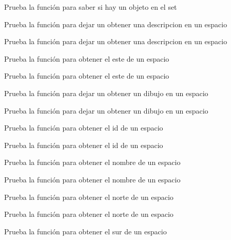 \begin{DoxyRefList}
Prueba la función para saber si hay un objeto en el set  
\item[\label{test__test000277}%
\Hypertarget{test__test000277}%
Member \hyperlink{space__test_8h_aebfa57e927e8f871e73425975c11976b}{test2\+\_\+space\+\_\+get\+\_\+description} ()]Prueba la función para dejar un obtener una descripcion en un espacio 

Prueba la función para dejar un obtener una descripcion en un espacio  
\item[\label{test__test000263}%
\Hypertarget{test__test000263}%
Member \hyperlink{space__test_8h_a249293510e61c6d5465f52c14343d02b}{test2\+\_\+space\+\_\+get\+\_\+east} ()]Prueba la función para obtener el este de un espacio 

Prueba la función para obtener el este de un espacio  
\item[\label{test__test000273}%
\Hypertarget{test__test000273}%
Member \hyperlink{space__test_8h_a3422f19fd8a821a06ccba2feb52034c2}{test2\+\_\+space\+\_\+get\+\_\+gdesc} ()]Prueba la función para dejar un obtener un dibujo en un espacio 

Prueba la función para dejar un obtener un dibujo en un espacio  
\item[\label{test__test000267}%
\Hypertarget{test__test000267}%
Member \hyperlink{space__test_8h_af9087176b0d3c41d83a17a4918b13e31}{test2\+\_\+space\+\_\+get\+\_\+id} ()]Prueba la función para obtener el id de un espacio 

Prueba la función para obtener el id de un espacio  
\item[\label{test__test000254}%
\Hypertarget{test__test000254}%
Member \hyperlink{space__test_8h_aee88ed31c63efc674051a4563aed86e2}{test2\+\_\+space\+\_\+get\+\_\+name} ()]Prueba la función para obtener el nombre de un espacio 

Prueba la función para obtener el nombre de un espacio  
\item[\label{test__test000259}%
\Hypertarget{test__test000259}%
Member \hyperlink{space__test_8h_a61891c9cebb9d26dc9f149ad8341517c}{test2\+\_\+space\+\_\+get\+\_\+north} ()]Prueba la función para obtener el norte de un espacio 

Prueba la función para obtener el norte de un espacio  
\item[\label{test__test000261}%
\Hypertarget{test__test000261}%
Member \hyperlink{space__test_8h_a40fe07c07c1069023b362a9e506c4c59}{test2\+\_\+space\+\_\+get\+\_\+south} ()]Prueba la función para obtener el sur de un espacio 


\end{DoxyRefList}
